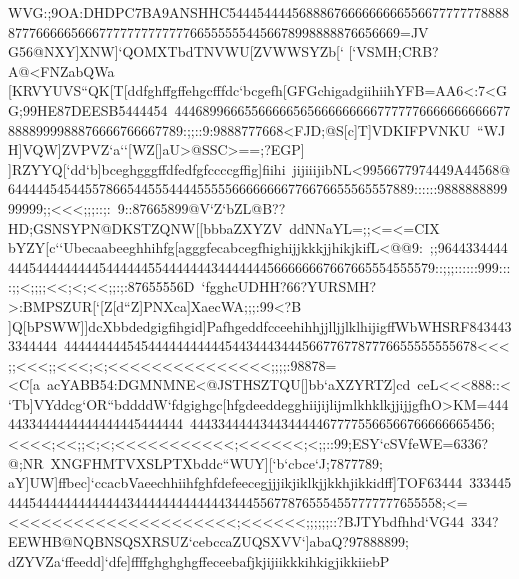 {{{ WVG:;9OA:DHDPC7BA9ANSHHC544454444568886766666666655667777777888887776666656667777777777777665555554456678998888876656669=JV%
 G56@NXY]XNW]`QOMXTbdTNVWU[ZVWWSYZb[`%
 [`VSMH;CRB?A@<FNZabQWa}
 \hbox{[KRVYUVS``QK[T[ddfghffgffehgcfffdc`bcgefh[GFGchigadgiihiihYFB=AA6<:7<GG;99HE87DEESB5444454%
 4446899666556666656566666666677777766666666666778888999988876666766667789:;;::9:9888777668<FJD;@S[c]T]VDKIFPVNKU%
 ``WJH]VQW]ZVPVZ`a``[WZ[]aU>@SSC>==;?EGP]}
 \hbox{]RZYYQ[`dd`b]bceghgggffdfedfgfccccgffig]fiihi%
 jijiiijibNL<9956677974449A44568@6444445454455786654455544445555566666666776676655565557889::::::988888889999999;;<<<;;;::;:%
 9::87665899@V`Z`bZL@B??HD;GSNSYPN@DKSTZQNW[[bbbaZXYZV%
 ddNNaYL=;;<=<=CIX}
 \hbox{bYZY[c``Ubecaabeeghhihfg[agggfecabcegfhighijjkkkjjhikjkifL<@@9:%
 ;;96443344444445444444444544444455444444434444444566666667667665554555579::;;;::::::999::::;;<;;;;<<;<;<<;;:;:87655556D%
 `fgghcUDHH?66?YURSMH?>:BMPSZUR[`[Z[d``Z]PNXca]XaecWA;;;:99<?B}
 \hbox{]Q[bPSWW]]dcXbbdedgigfihgid]PafhgeddfcceehihhjjlljjlklhijigffWbWHSRF8434433344444%
 44444444454544444444444544344434445667767787776655555555678<<<;;<<<;;<<<;<;<<<<<<<<<<<<<<<;;;;:98878=<C[a%
 acYABB54:DGMNMNE<@JSTHSZTQU[]bb`aXZYRTZ]cd%
 ceL<<<888::<}
 \hbox{`Tb]VYddcg`OR``bddddW`fdgighgc[hfgdeeddegghiijijlijmlkhklkjjijjgfhO>KM=4444433444444444444445444444%
 4443344444344344444677775566566766666665456;<<<<;<<;;<;<;<<<<<<<<<<<;<<<<<<;<;;::99;ESY`cSVfeWE=6336?@;NR%
 XNGFHMTVXSLPTXbddc``WUY][`b`cbce`J;7877789;}
 \hbox{aY]UW]ffbec]`ccacbVaeechhiihfghfdefeecegjjjikjiklkjjkkhjikkidff]TOF63444%
 33344544454444444444444344444444444443444556778765554557777777655558;<=<<<<<<<<<<<<<<<<<<<<<;<<<<<<;;;;;;::?BJTYbdfhhd`VG44%
 334?EEWHB@NQBNSQSXRSUZ`cebccaZUQSXVV`]abaQ?97888899;}
 \hbox{dZYVZa`ffeedd]`dfe]ffffghghghgffeceebafjkjijiikkkihkigjikkiiebP%
}}}

